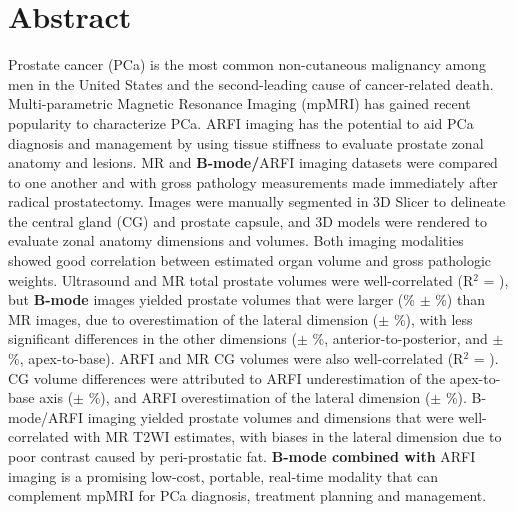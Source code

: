 \section*{Abstract}
Prostate cancer (PCa) is the most common non-cutaneous malignancy among men in
the United States and the second-leading cause of cancer-related death.
Multi-parametric Magnetic Resonance Imaging (mpMRI) has gained recent
popularity to characterize PCa.  ARFI imaging has the potential to aid PCa
diagnosis and management by using tissue stiffness to evaluate prostate zonal
anatomy and lesions.  MR and \textbf{B-mode/}ARFI \invivo imaging datasets were
compared to one another and with gross pathology measurements made immediately
after radical prostatectomy.  Images were manually segmented in 3D Slicer to
delineate the central gland (CG) and prostate capsule, and 3D models were
rendered to evaluate zonal anatomy dimensions and volumes.  Both imaging
modalities showed good correlation between estimated organ volume and gross
pathologic weights.  Ultrasound and MR total prostate volumes were
well-correlated (R$^2$ = \MRarfiVolTotalRsq), but \textbf{B-mode} images
yielded prostate volumes that were larger (\MRarfiVolTotalMeanDiff\% $\pm$
\MRarfiVolTotalStdDiff\%) than MR images, due to overestimation of the lateral
dimension (\ARFImrTotalLatLatMeanPct $\pm$ \ARFImrTotalLatLatStdPct\%), with
less significant differences in the other dimensions
(\ARFImrTotalAntPostMeanPct $\pm$ \ARFImrTotalAntPostStdPct\%,
anterior-to-posterior, and \ARFImrTotalApexBaseMeanPct $\pm$
\ARFImrTotalApexBaseStdPct\%, apex-to-base).  ARFI and MR CG volumes were also
well-correlated (R$^2$ = \MRarfiVolCentralRsq).  CG volume differences were
attributed to ARFI underestimation of the apex-to-base axis
(\ARFImrCentralApexBaseMeanPct $\pm$ \ARFImrCentralApexBaseStdPct\%), and ARFI
overestimation of the lateral dimension (\ARFImrCentralLatLatMeanPct $\pm$
\ARFImrCentralLatLatStdPct\%).  B-mode/ARFI imaging yielded prostate volumes
and dimensions that were well-correlated with MR T2WI estimates, with biases in
the lateral dimension due to poor contrast caused by peri-prostatic fat.
\textbf{B-mode combined with} ARFI imaging is a promising low-cost, portable,
real-time modality that can complement mpMRI for PCa diagnosis, treatment
planning and management.
